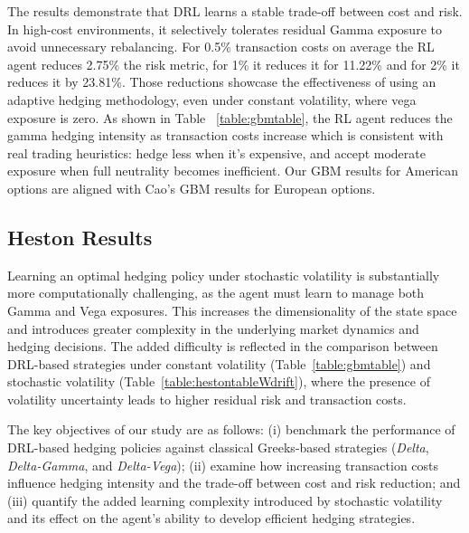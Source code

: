 \documentclass[a4paper,fleqn]{cas-dc}
\begin{document}
The results demonstrate that DRL learns a stable trade-off between cost and risk. In high-cost environments, it selectively tolerates residual Gamma exposure to avoid unnecessary rebalancing. For 0.5\% transaction costs on average the RL agent reduces 2.75\% the risk metric, for 1\% it reduces it for 11.22\% and for 2\% it reduces it by 23.81\%.
Those reductions showcase the effectiveness of using an adaptive hedging methodology, even under constant volatility, where vega exposure is zero. As shown in Table ~\ref{table:gbmtable}, the RL agent reduces the gamma hedging intensity as transaction costs increase which is consistent with real trading heuristics: hedge less when it's expensive, and accept moderate exposure when full neutrality becomes inefficient. Our GBM results for American options are aligned with Cao's \cite{DH_1} GBM results for European options.

\subsection{Heston Results} 
\label{sec:heston_results}

Learning an optimal hedging policy under stochastic volatility is substantially more computationally challenging, as the agent must learn to manage both Gamma and Vega exposures. This increases the dimensionality of the state space and introduces greater complexity in the underlying market dynamics and hedging decisions. The added difficulty is reflected in the comparison between DRL-based strategies under constant volatility (Table~\ref{table:gbmtable}) and stochastic volatility (Table~\ref{table:hestontableWdrift}), where the presence of volatility uncertainty leads to higher residual risk and transaction costs.

The key objectives of our study are as follows:  
(i) benchmark the performance of DRL-based hedging policies against classical Greeks-based strategies (\textit{Delta}, \textit{Delta-Gamma}, and \textit{Delta-Vega});  
(ii) examine how increasing transaction costs influence hedging intensity and the trade-off between cost and risk reduction; and  
(iii) quantify the added learning complexity introduced by stochastic volatility and its effect on the agent’s ability to develop efficient hedging strategies.
\end{document}

